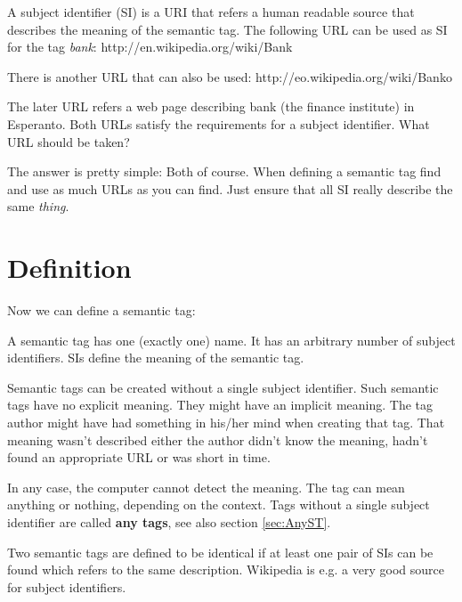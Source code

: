 A subject identifier (SI) is a URI that refers a human readable source that describes the meaning of the semantic tag. The following URL can be used as SI for the tag {\it bank}: http://en.wikipedia.org/wiki/Bank

There is another URL that can also be used:
http://eo.wikipedia.org/wiki/Banko

The later URL refers a web page describing bank (the finance institute) in Esperanto. Both URLs satisfy the requirements for a subject identifier. What URL should be taken?

The answer is pretty simple: Both of course. When defining a semantic tag find and use as much URLs as you can find. Just ensure that all SI really describe the same {\it thing}.

\section{Definition}
Now we can define a semantic tag:

A semantic tag has one (exactly one) name. It has an arbitrary number of subject identifiers. SIs define the meaning of the semantic tag.

Semantic tags can be created without a single subject identifier. Such semantic tags have no explicit meaning. They might have an implicit meaning. The tag author might have had something in his/her mind when creating that tag. That meaning wasn't described either the author didn't know the meaning, hadn't found an appropriate URL or was short in time.

In any case, the computer cannot detect the meaning. The tag can mean anything or nothing, depending on the context. Tags without a single subject identifier are called {\bf any tags}, see also section \ref{sec:AnyST}.

Two semantic tags are defined to be identical if at least one pair of SIs can be found which refers to the same description. Wikipedia is e.g. a very good source for subject identifiers.


